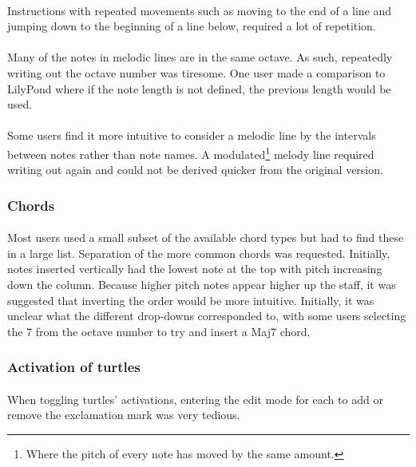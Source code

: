 \paragraph{} Instructions with repeated movements such as moving to the end of a line and jumping down to the beginning of a line below, required a lot of repetition.

\paragraph{} Many of the notes in melodic lines are in the same octave. As such, repeatedly writing out the octave number was tiresome. One user made a comparison to LilyPond \cite{sandberg:lily} where if the note length is not defined, the previous length would be used.

\paragraph{} Some users find it more intuitive to consider a melodic line by the intervals between notes rather than note names. A modulated\footnote{Where the pitch of every note has moved by the same amount.} melody line required writing out again and could not be derived quicker from the original version.

\subsubsection{Chords}

\paragraph{} Most users used a small subset of the available chord types but had to find these in a large list. Separation of the more common chords was requested. Initially, notes inserted vertically  had the lowest note at the top with pitch increasing down the column. Because higher pitch notes appear higher up the staff, it was suggested that inverting the order would be more intuitive. Initially, it was unclear what the different drop-downs corresponded to, with some users selecting the 7 from the octave number to try and insert a Maj7 chord.

\subsubsection{Activation of turtles}

\paragraph{} When toggling turtles' activations, entering the edit mode for each to add or remove the exclamation mark was very tedious.


